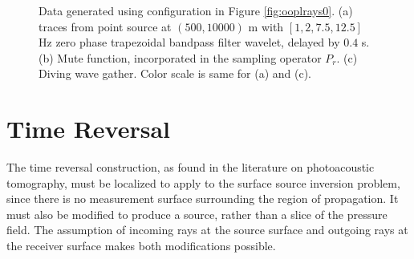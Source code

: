 \documentclass[georeport,12pt]{geophysics}
\begin{document}
\begin{figure}
  \centering
  \caption{Data generated using configuration in Figure
    \ref{fig:ooplrays0}. (a) traces from point source at $(500,10000)$ m
    with $[1, 2, 7.5, 12.5]$ Hz zero phase trapezoidal bandpass
    filter wavelet, delayed by $0.4$ s. (b) Mute function,
    incorporated in the sampling operator $P_r$. (c) Diving wave
    gather. Color scale is same for (a) and (c).}
\end{figure}

\section{Time Reversal}

The time reversal construction, as found in the literature on photoacoustic tomography,
must be localized to apply to the surface source inversion problem,
since there is no measurement surface surrounding the region of
propagation. It must also be modified to produce a source, rather than
a slice of the pressure field. The assumption of incoming rays at the source surface and
outgoing rays at the receiver surface makes both modifications  
possible.
\end{document}
